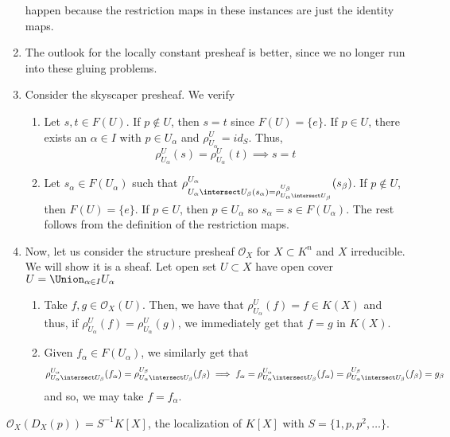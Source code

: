 \documentclass[11pt,leqno,oneside]{amsbook}
\renewcommand{\F}{F}
\renewcommand{\O}{\mathcal{O}}
\numberwithin{thm}{section}
\begin{document}
\begin{example}
\begin{enumerate}[label=(\arabic*)]
    happen because the restriction maps in these instances are just
    the identity maps.
  \item The outlook for the locally constant presheaf is better, since
    we no longer run into these gluing problems.
  \item Consider the skyscaper presheaf. We verify
    \begin{enumerate}
    \item Let \(s,t \in \F(U)\). If \(p \not \in U\), then \(s=t\)
      since \(\F(U) = \{e\}\). If \(p \in U\), there exists an
      \(\alpha \in I\) with \(p \in U_\alpha\) and \(\rho^U_{U_\alpha}
      = id_S\). Thus, \[
        \rho^U_{U_\alpha}(s) = \rho^U_{U_\alpha}(t) \implies s=t
      \]
    \item Let \(s_\alpha \in \F(U_\alpha)\) such that
      \(\rho^{U_\alpha}_{U_\alpha \intersect U_\beta(s_\alpha) =
        \rho^{U_\beta}_{U_\alpha \intersect U_\beta}}(s_\beta)\). If
      \(p \not \in U\), then \(\F(U) = \{e\}\). If \(p \in U\), then
      \(p \in U_\alpha\) so \(s_\alpha = s \in F(U_\alpha)\). The rest
      follows from the definition of the restriction maps.
    \end{enumerate}
  \item Now, let us consider the structure presheaf \(\O_X\) for \(X
    \subset K^n\) and \(X\) irreducible. We will
    show it is a sheaf. Let open set \(U \subset X\) have open cover
    \(U = \Union_{\alpha \in I} U_\alpha\)
    \begin{enumerate}
    \item Take \(f,g \in \O_X(U)\). Then, we have that
      \(\rho^U_{U_\alpha}(f) = f \in K(X)\) and thus, if
      \(\rho^U_{U_\alpha}(f) = \rho^U_{U_\alpha}(g)\), we immediately
      get that \(f=g\) in \(K(X)\).
    \item Given \(f_\alpha \in \F(U_\alpha)\), we similarly get
      that \[
        \rho^{U_\alpha}_{U_\alpha \intersect U_\beta}(f_\alpha) =
        \rho^{U_\beta}_{U_\alpha \intersect U_\beta}(f_\beta) \implies
        f_\alpha = \rho^{U_\alpha}_{U_\alpha \intersect U_\beta}(f_\alpha) =
        \rho^{U_\beta}_{U_\alpha \intersect U_\beta}(f_\beta) = g_\beta
      \]
      and so, we may take \(f = f_\alpha\). 
    \end{enumerate}
  \end{enumerate}
\end{example}
\begin{prop}
  \(\O_X(D_X(p)) = S^{-1}K[X]\), the localization of \(K[X]\) with \(S
  = \{1,p,p^2, \ldots\}\).
\end{prop}
\end{document}
